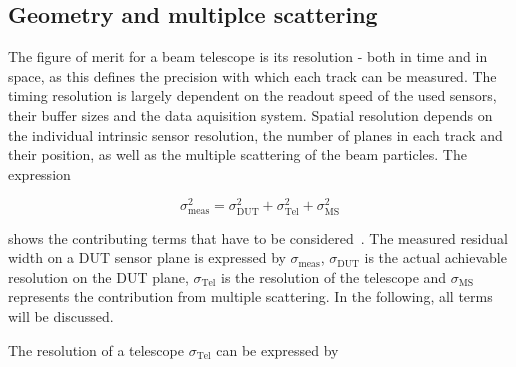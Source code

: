 
\subsection{Geometry and multiplce scattering}

The figure of merit for a beam telescope is its resolution  - both in time and in space, as this defines the precision with which each track can be measured. 
The timing resolution is largely dependent on the readout speed of the used sensors, their buffer sizes and the data aquisition system. 
Spatial resolution depends on the individual intrinsic sensor resolution, the number of planes in each track and their position, as well as the multiple scattering of the beam particles. 
The expression

\begin{equation}
\label{eq:telescoperesolutionequation}
\sigma_{\textrm{meas}}^2 = \sigma_{\textrm{DUT}}^2 + \sigma_{\textrm{Tel}}^2 +
\sigma_{\textrm{MS}}^2
\end{equation}

\noindent shows the contributing terms that have to be considered~\cite{ref:eudetreport200902}. 
The measured residual width on a DUT sensor plane is expressed by $\sigma_{\textrm{meas}}$, $\sigma_{\textrm{DUT}}$ is the actual achievable resolution on the DUT plane, $\sigma_{\textrm{Tel}}$ is the resolution of the telescope and $\sigma_{\textrm{MS}}$ represents the contribution from multiple scattering.
In the following, all terms will be discussed.

The resolution of a telescope $\sigma_{\textrm{Tel}}$ can be expressed by

